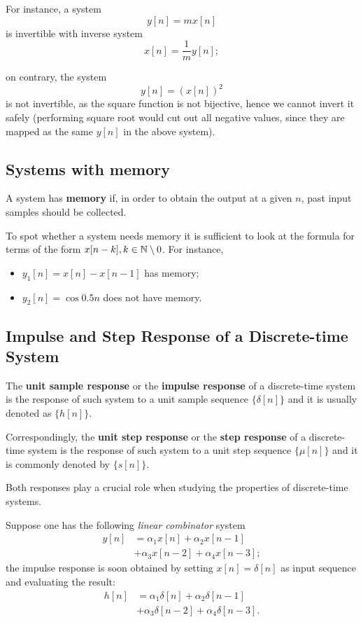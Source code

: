 \documentclass[\documentfontsize, twocolumn]{\classname}
\begin{document}
For instance, a system
\[
	y[n] = m x[n]
\]
is invertible with inverse system
\[
	x[n] = \frac 1 m y[n];
\]

on contrary, the system
\[
	y[n] = (x[n])^2
\]
is not invertible, as the square function is not bijective, hence we cannot
invert it safely (performing square root would cut out all negative values,
since they are mapped as the same $y[n]$ in the above system).

\subsection{Systems with memory}

A system has \textbf{memory} if, in order to obtain the output at a given $n$,
past input samples should be collected.

To spot whether a system needs memory it is sufficient to look at the formula
for terms of the form $x[n-k], k\in \mathbb N\setminus{0}$. For instance,
\begin{itemize}
	\item $y_1[n] = x[n] - x[n-1]$ has memory;
	\item $y_2[n] = \cos{0.5 n}$ does not have memory.
\end{itemize}

\subsection{Impulse and Step Response of a Discrete-time System}

The \textbf{unit sample response} or the \textbf{impulse response} of a discrete-time system is the response of such system to a unit sample sequence $\{\delta[n]\}$ and it is usually denoted as $\{h[n]\}$.

Correspondingly, the \textbf{unit step response} or the \textbf{step response} of a discrete-time system is the response of such system to a unit step sequence $\{\mu[n]\}$ and it is commonly denoted by $\{s[n]\}$.

Both responses play a crucial role when studying the properties of discrete-time systems.

Suppose one has the following \emph{linear combinator} system
\begin{align*}
    y[n] &= \alpha_1 x[n] + \alpha_2 x[n-1]\\
         &+ \alpha_3 x[n-2] + \alpha_4 x[n-3];
\end{align*}
the impulse response is soon obtained by setting $x[n] = \delta[n]$ as input sequence and evaluating the result:
\begin{align*}
    h[n] &= \alpha_1 \delta[n] + \alpha_2 \delta[n-1]\\
         &+ \alpha_3 \delta[n-2] + \alpha_4 \delta[n-3].
\end{align*}
\end{document}
